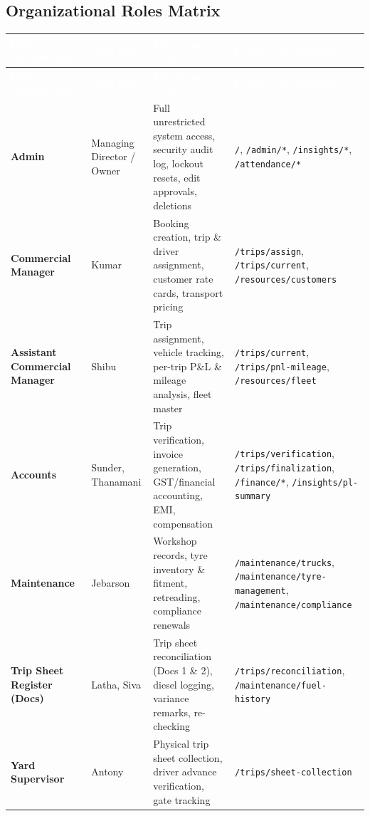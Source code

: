 \documentclass[11pt,a4paper]{article}
\newcommand{\theadstyle}[1]{\textcolor{white}{\bfseries #1}}
\begin{document}
\subsection{Organizational Roles Matrix}
\begin{longtable}{>{\bfseries}L{3.0cm} L{2.0cm} L{4.6cm} L{3.4cm}}
\theadstyle{Role (Designation)} & \theadstyle{Staff Rep.} & \theadstyle{Functional Scope} & \theadstyle{Primary Workspaces} \\
\endfirsthead
{}
\theadstyle{Role (Designation)} & \theadstyle{Staff Rep.} & \theadstyle{Functional Scope} & \theadstyle{Primary Workspaces} \\
\endhead
Admin & Managing Director / Owner & Full unrestricted system access, security audit log, lockout resets, edit approvals, deletions & \texttt{/}, \texttt{/admin/*}, \texttt{/insights/*}, \texttt{/attendance/*} \\
Commercial Manager & Kumar & Booking creation, trip \& driver assignment, customer rate cards, transport pricing & \texttt{/trips/assign}, \texttt{/trips/current}, \texttt{/resources/customers} \\
Assistant Commercial Manager & Shibu & Trip assignment, vehicle tracking, per-trip P\&L \& mileage analysis, fleet master & \texttt{/trips/current}, \texttt{/trips/pnl-mileage}, \texttt{/resources/fleet} \\
Accounts & Sunder, Thanamani & Trip verification, invoice generation, GST/financial accounting, EMI, compensation & \texttt{/trips/verification}, \texttt{/trips/finalization}, \texttt{/finance/*}, \texttt{/insights/pl-summary} \\
Maintenance & Jebarson & Workshop records, tyre inventory \& fitment, retreading, compliance renewals & \texttt{/maintenance/trucks}, \texttt{/maintenance/tyre-management}, \texttt{/maintenance/compliance} \\
Trip Sheet Register (Docs) & Latha, Siva & Trip sheet reconciliation (Docs 1 \& 2), diesel logging, variance remarks, re-checking & \texttt{/trips/reconciliation}, \texttt{/maintenance/fuel-history} \\
Yard Supervisor & Antony & Physical trip sheet collection, driver advance verification, gate tracking & \texttt{/trips/sheet-collection} \\
\end{longtable}
\end{document}
